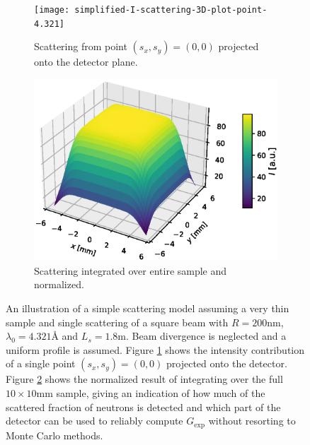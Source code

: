 \documentclass{article}
\begin{document}
\begin{figure}[htbp]
	\centering
	\begin{subfigure}[b]{0.49\textwidth}
		\centering
		\texttt{[image: simplified-I-scattering-3D-plot-point-4.321]}
		\caption{Scattering from point $(s_x,s_y) = (0,0)$ projected onto the detector plane.}
		\label{fig:simplified-scattering-3D:a}
	\end{subfigure}
	\hfill
	\begin{subfigure}[b]{0.49\textwidth}
		\centering
		\includegraphics[width=\textwidth]{simplified-I-scattering-3D-plot-4.321}
		\caption{Scattering integrated over entire sample and normalized.}
		\label{fig:simplified-scattering-3D:b}
	\end{subfigure}
	\caption{An illustration of a simple scattering model assuming a very thin sample and single scattering of a square beam with $R=200\unit{\nano\meter}$, $\lambda_0 = 4.321$Å and $L_s = 1.8\unit\meter$. Beam divergence is neglected and a uniform profile is assumed. Figure \ref{fig:simplified-scattering-3D:a} shows the intensity contribution of a single point $(s_x,s_y) = (0,0)$ projected onto the detector. Figure \ref{fig:simplified-scattering-3D:b} shows the normalized result of integrating over the full $10\times10\unit{\milli\meter}$ sample, giving an indication of how much of the scattered fraction of neutrons is detected and which part of the detector can be used to reliably compute $G_\text{exp}$ without resorting to Monte Carlo methods.}
	\label{fig:simplified-scattering-3D}
\end{figure}
\end{document}
